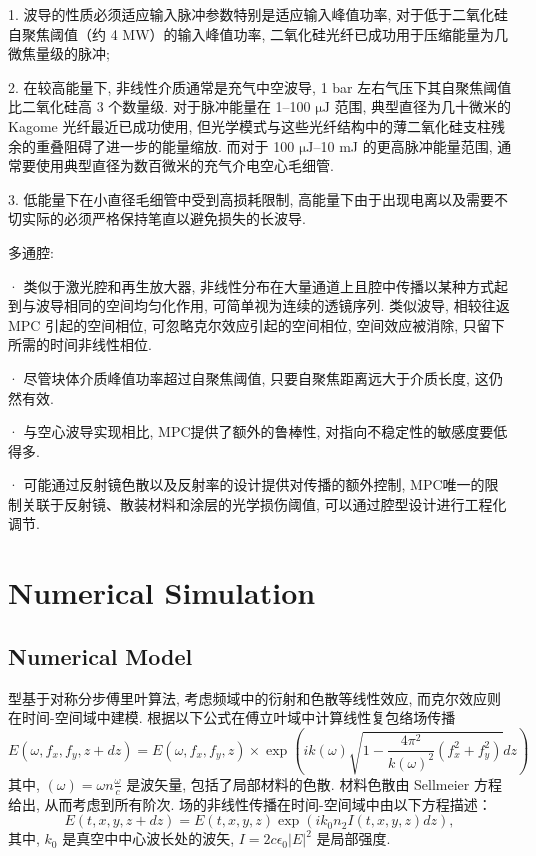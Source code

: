 \documentclass[14pt,a4paper,oneside]{article}
\numberwithin{equation}{subsection}             %
\numberwithin{figure}{subsection}               %
\begin{document}
1. 波导的性质必须适应输入脉冲参数特别是适应输入峰值功率, 对于低于二氧化硅自聚焦阈值（约 4 MW）的输入峰值功率, 二氧化硅光纤已成功用于压缩能量为几微焦量级的脉冲;

2. 在较高能量下, 非线性介质通常是充气中空波导, 1 bar 左右气压下其自聚焦阈值比二氧化硅高 3 个数量级. 对于脉冲能量在 1–100 $\mathrm{\mu J}$ 范围, 典型直径为几十微米的 Kagome 光纤最近已成功使用, 但光学模式与这些光纤结构中的薄二氧化硅支柱残余的重叠阻碍了进一步的能量缩放. 而对于 100 $\mathrm{\mu J}$–10 mJ 的更高脉冲能量范围, 通常要使用典型直径为数百微米的充气介电空心毛细管. 

3. 低能量下在小直径毛细管中受到高损耗限制, 高能量下由于出现电离以及需要不切实际的必须严格保持笔直以避免损失的长波导.

多通腔:

· 类似于激光腔和再生放大器, 非线性分布在大量通道上且腔中传播以某种方式起到与波导相同的空间均匀化作用, 可简单视为连续的透镜序列. 类似波导, 相较往返 MPC 引起的空间相位, 可忽略克尔效应引起的空间相位, 空间效应被消除, 只留下所需的时间非线性相位. 

· 尽管块体介质峰值功率超过自聚焦阈值, 只要自聚焦距离远大于介质长度, 这仍然有效. 

· 与空心波导实现相比, MPC提供了额外的鲁棒性, 对指向不稳定性的敏感度要低得多.

· 可能通过反射镜色散以及反射率的设计提供对传播的额外控制, MPC唯一的限制关联于反射镜、散装材料和涂层的光学损伤阈值, 可以通过腔型设计进行工程化调节. 


\section{Numerical Simulation}

\subsection{Numerical Model}

型基于对称分步傅里叶算法, 考虑频域中的衍射和色散等线性效应, 而克尔效应则在时间-空间域中建模. 根据以下公式在傅立叶域中计算线性复包络场传播
\begin{equation}
    E(\omega,f_x,f_y,z+dz)=E(\omega,f_x,f_{y},z)\times\exp\left(ik(\omega)\sqrt{1-\frac{4\pi^2}{k(\omega)^2}(f_x^2+f_y^2)}dz\right)
    \label{eq:2.1.1}
\end{equation}
其中, $(\omega)=\omega n\frac{\omega}{c}$ 是波矢量, 包括了局部材料的色散. 材料色散由 Sellmeier 方程给出, 从而考虑到所有阶次. 场的非线性传播在时间-空间域中由以下方程描述：
\begin{equation}
    E(t,x,y,z+dz)=E(t,x,y,z)\exp(ik_{0}n_{2}I(t,x,y,z)dz),
    \label{eq:2.1.2}
\end{equation}
其中, $k_0$ 是真空中中心波长处的波矢, $I=2c\epsilon_0|E|^2$ 是局部强度. 
\end{document}

